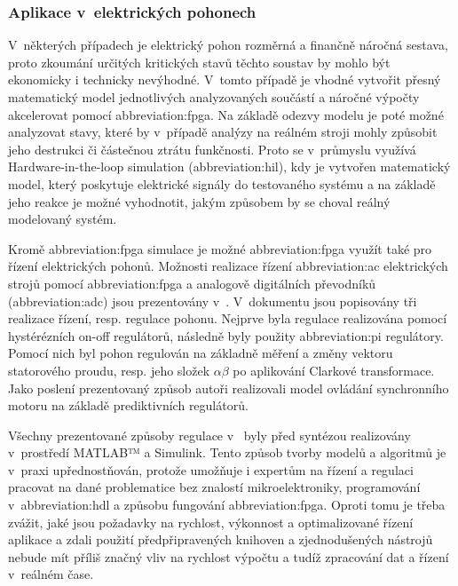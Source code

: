 \documentclass[a4paper, twoside, 11pt]{article}
\begin{document}
			\subsubsection{Aplikace v~elektrických pohonech}
			V~některých případech je elektrický pohon rozměrná a finančně náročná sestava, proto zkoumání určitých kritických stavů těchto soustav by mohlo být ekonomicky i technicky nevýhodné. V~tomto případě je vhodné vytvořit přesný matematický model jednotlivých analyzovaných součástí a náročné výpočty akcelerovat pomocí \gls{abbreviation:fpga}. Na základě odezvy modelu je poté možné analyzovat stavy, které by v~případě analýzy na reálném stroji mohly způsobit jeho destrukci či částečnou ztrátu funkčnosti. Proto se v~průmyslu využívá Hardware-in-the-loop simulation (\gls{abbreviation:hil}), kdy je vytvořen matematický model, který poskytuje elektrické signály do testovaného systému a na základě jeho reakce je možné vyhodnotit, jakým způsobem by se choval reálný modelovaný systém. \cite{andina-advanced-features-and-industrial-applications-of-fpga} \cite{mathworks-discovery-hil-simulation}\par
			Kromě \gls{abbreviation:fpga} simulace je možné \gls{abbreviation:fpga} využít také pro řízení elektrických pohonů. Možnosti realizace řízení \gls{abbreviation:ac} elektrických strojů pomocí \gls{abbreviation:fpga} a analogově digitálních převodníků (\gls{abbreviation:adc}) jsou prezentovány v~\cite{naouar-fpga-based-current-controllers-for-ac-machine-drives}. V~dokumentu jsou popisovány tři realizace řízení, resp. regulace pohonu. Nejprve byla regulace realizována pomocí hystérézních on-off regulátorů, následně byly použity \gls{abbreviation:pi} regulátory. Pomocí nich byl pohon regulován na základně měření a změny vektoru statorového proudu, resp. jeho složek $\alpha \beta$ po aplikování Clarkové transformace. Jako poslení prezentovaný způsob autoři realizovali model ovládání synchronního motoru na základě prediktivních regulátorů. \cite{naouar-fpga-based-current-controllers-for-ac-machine-drives}\par Všechny prezentované způsoby regulace v~\cite{naouar-fpga-based-current-controllers-for-ac-machine-drives} byly před syntézou realizovány v~prostředí MATLAB™️ a Simulink. Tento způsob tvorby modelů a algoritmů je v~praxi upřednostňován, protože umožňuje i expertům na řízení a regulaci pracovat na dané problematice bez znalostí mikroelektroniky, programování v~\gls{abbreviation:hdl} a způsobu fungování \gls{abbreviation:fpga}. Oproti tomu je třeba zvážit, jaké jsou požadavky na rychlost, výkonnost a optimalizované řízení aplikace a zdali použití předpřipravených knihoven a zjednodušených nástrojů nebude mít příliš značný vliv na rychlost výpočtu a tudíž zpracování dat a řízení v~reálném čase.~\cite{naouar-fpga-based-current-controllers-for-ac-machine-drives}
			
\end{document}
